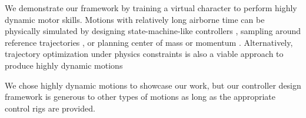 We demonstrate our framework by training a virtual character to
perform highly dynamic motor skills. Motions with relatively long
airborne time can be physically simulated by designing
state-machine-like controllers
\cite{Hodgins:1995:AHA,Faloutsos:2001:CCF}, sampling around reference
trajectories \cite{Liu:2010:SCM,Liu:2012:TRC}, or planning center of
mass or momentum
\cite{Mordatch:2010:RPL,Ha:2012:FAL}. Alternatively, trajectory optimization under
physics constraints is also a viable approach to produce highly
dynamic motions

We chose highly dynamic motions to showcase our work, but our
controller design framework is generous to other types of motions as
long as the appropriate control rigs are provided.


